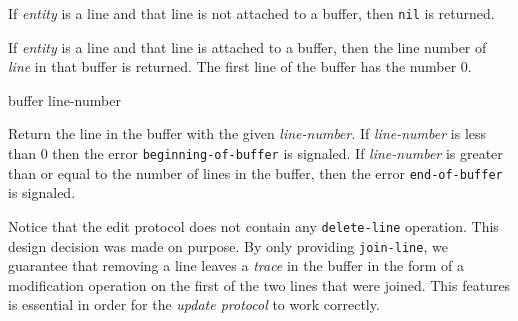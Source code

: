 If \textit{entity} is a line and that line is not attached to a
buffer, then \texttt{nil} is returned.

If \textit{entity} is a line and that line is attached to a buffer,
then the line number of \textit{line} in that buffer is returned.  The
first line of the buffer has the number $0$.

 {buffer line-number}

Return the line in the buffer with the given \textit{line-number}.  If
\textit{line-number} is less than $0$ then the error
\texttt{beginning-of-buffer} is signaled.  If \textit{line-number} is
greater than or equal to the number of lines in the buffer, then the
error \texttt{end-of-buffer} is signaled.

Notice that the edit protocol does not contain any
\texttt{delete-line} operation.  This design decision was made on
purpose.  By only providing \texttt{join-line}, we guarantee that
removing a line leaves a \emph{trace} in the buffer in the form of a
modification operation on the first of the two lines that were
joined.  This features is essential in order for the \emph{update
  protocol} to work correctly.
